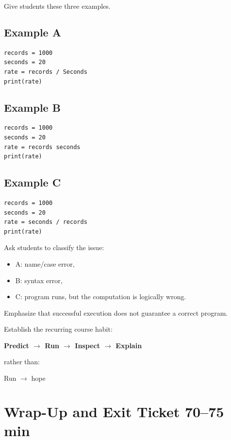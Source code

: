 \documentclass[11pt]{article}
\begin{document}
Give students these three examples.

\subsection*{Example A}

\begin{lstlisting}
records = 1000
seconds = 20
rate = records / Seconds
print(rate)
\end{lstlisting}

\subsection*{Example B}

\begin{lstlisting}
records = 1000
seconds = 20
rate = records seconds
print(rate)
\end{lstlisting}

\subsection*{Example C}

\begin{lstlisting}
records = 1000
seconds = 20
rate = seconds / records
print(rate)
\end{lstlisting}

Ask students to classify the issue:

\begin{itemize}
    \item A: name/case error,
    \item B: syntax error,
    \item C: program runs, but the computation is logically wrong.
\end{itemize}

Emphasize that successful execution does not guarantee a correct program.

Establish the recurring course habit:

\begin{center}
\textbf{Predict $\rightarrow$ Run $\rightarrow$ Inspect $\rightarrow$ Explain}
\end{center}

rather than:

\begin{center}
Run $\rightarrow$ hope
\end{center}

\section{Wrap-Up and Exit Ticket \hfill 70--75 min}
\end{document}
